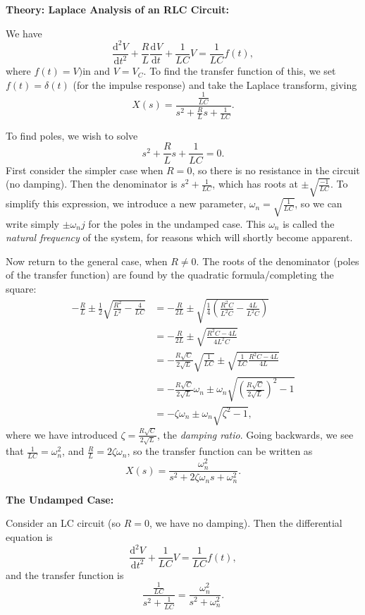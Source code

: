 \documentclass{article}
\newcommand{\deriv}[3][]{\frac{\mathrm{d}^{#1}#2}{\mathrm{d}#3^{#1}}}
\begin{document}
\clearpage


\textbf{Theory: Laplace Analysis of an RLC Circuit:}\bigskip

We have
\[\deriv[2]{V}{t}+\frac{R}{L}\deriv{V}{t}+\frac{1}{LC}V=\frac{1}{LC}f(t),\]
where $f(t)=V){\mathrm{in}}$ and $V=V_C$. To find the transfer function of this, we set $f(t)=\delta(t)$ (for the impulse response) and take the Laplace transform, giving
\[X(s)=\frac{\frac{1}{LC}}{s^2+\frac{R}{L}s+\frac{1}{LC}}.\]

To find poles, we wish to solve
\[s^2+\frac{R}{L}s+\frac{1}{LC}=0.\]
First consider the simpler case when $R=0$, so there is no resistance in the circuit (no damping). Then the denominator is $s^2+\frac{1}{LC}$, which has roots at $\pm\sqrt{\frac{-1}{LC}}$. To simplify this expression, we introduce a new parameter, $\omega_n=\sqrt{\frac{1}{LC}}$, so we can write simply $\pm\omega_nj$ for the poles in the undamped case. This $\omega_n$ is called the \textit{natural frequency} of the system, for reasons which will shortly become apparent.

Now return to the general case, when $R\neq 0$. The roots of the denominator (poles of the transfer function) are found by the quadratic formula/completing the square:
\begin{align*}
	-\frac{R}{L}\pm\frac{1}{2}\sqrt{\frac{R^2}{L^2}-\frac{4}{LC}}&= -\frac{R}{2L}\pm\sqrt{\frac{1}{4}\left( \frac{R^2C}{L^2C}-\frac{4L}{L^2C} \right)}\\
	&=-\frac{R}{2L}\pm\sqrt{ \frac{R^2C-4L}{4L^2C} }\\
	&=-\frac{R\sqrt{C}}{2\sqrt{L}}\sqrt{\frac{1}{LC}}\pm\sqrt{ \frac{1}{LC}\frac{R^2C-4L}{4L} }\\
	&=-\frac{R\sqrt{C}}{2\sqrt{L}}\omega_n \pm \omega_n\sqrt{\left(\frac{R\sqrt{C}}{2\sqrt{L}}\right)^2-1}\\
	&= -\zeta\omega_n \pm \omega_n\sqrt{\zeta^2-1},
\end{align*}
 where we have introduced $\zeta=\frac{R\sqrt{C}}{2\sqrt{L}}$, the \textit{damping ratio}. Going backwards, we see that $\frac{1}{LC}=\omega_n^2$, and $\frac{R}{L}=2\zeta\omega_n$, so the transfer function can be written as
 \[X(s)=\frac{\omega_n^2}{s^2+2\zeta\omega_ns+\omega_n^2}.\]

\clearpage



\textbf{The Undamped Case:}\bigskip

Consider an LC circuit (so $R=0$, we have no damping). Then the differential equation is
\[\deriv[2]{V}{t}+\frac{1}{LC}V=\frac{1}{LC}f(t),\]
and the transfer function is
\[\frac{\frac{1}{LC}}{s^2+\frac{1}{LC}}=\frac{\omega_n^2}{s^2+\omega_n^2}.\]
\end{document}
